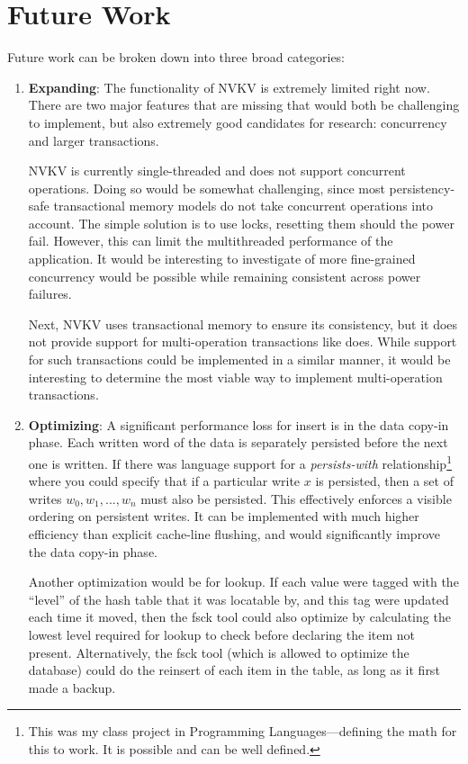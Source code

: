 \section{Future Work}

Future work can be broken down into three broad categories:
\begin{enumerate}
\item \textbf{Expanding}: The functionality of NVKV is extremely limited right
now. There are two major features that are missing that would both be
challenging to implement, but also extremely good candidates for research:
concurrency and larger transactions.

NVKV is currently single-threaded and does not support concurrent operations.
Doing so would be somewhat challenging, since most persistency-safe
transactional memory models do not take concurrent operations into account. The
simple solution is to use locks, resetting them should the power fail. However,
this can limit the multithreaded performance of the application. It would be
interesting to investigate of more fine-grained concurrency would be possible
while remaining consistent across power failures.

Next, NVKV uses transactional memory to ensure its consistency, but it does not
provide support for multi-operation transactions like \bdb does. While support
for such transactions could be implemented in a similar manner, it would be
interesting to determine the most viable way to implement multi-operation
transactions.

\item \textbf{Optimizing}: A significant performance loss for insert is in the
data copy-in phase. Each written word of the data is separately persisted before
the next one is written. If there was language support for a
\textit{persists-with} relationship\footnote{This was my class project in
Programming Languages---defining the math for this to work. It is possible and
can be well defined.} where you could specify that if a particular write $x$
is persisted, then a set of writes $w_0, w_1, ..., w_n$ must also be persisted.
This effectively enforces a visible ordering on persistent writes. It can be
implemented with much higher efficiency than explicit cache-line flushing, and
would significantly improve the data copy-in phase.

Another optimization would be for lookup. If each value were tagged with the
``level'' of the hash table that it was locatable by, and this tag were updated
each time it moved, then the fsck tool could also optimize by calculating the
lowest level required for lookup to check before declaring the item not present.
Alternatively, the fsck tool (which is allowed to optimize the database) could
do the reinsert of each item in the table, as long as it first made a backup.


\end{enumerate}
